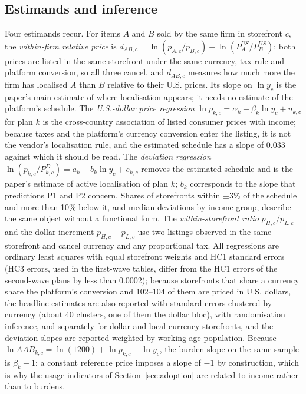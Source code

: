 \documentclass[11pt]{article}
\theoremstyle{definition}
\theoremstyle{remark}
\newcommand{\AAB}{\mathit{AAB}}
\begin{document}
\subsection{Estimands and inference}

Four estimands recur. For items $A$ and $B$ sold by the same firm in storefront $c$, the \emph{within-firm relative price} is $d_{AB,c}=\ln(p_{A,c}/p_{B,c})-\ln(P^{US}_A/P^{US}_B)$: both prices are listed in the same storefront under the same currency, tax rule and platform conversion, so all three cancel, and $d_{AB,c}$ measures how much more the firm has localised $A$ than $B$ relative to their U.S. prices. Its slope on $\ln y_c$ is the paper's main estimate of where localisation appears; it needs no estimate of the platform's schedule. The \emph{U.S.-dollar price regression} $\ln p_{k,c}=\alpha_k+\beta_k\ln y_c+u_{k,c}$ for plan $k$ is the cross-country association of listed consumer prices with income; because taxes and the platform's currency conversion enter the listing, it is not the vendor's localisation rule, and the estimated schedule has a slope of 0.033 against which it should be read. The \emph{deviation regression} $\ln(p_{k,c}/P^D_{k,c})=a_k+b_k\ln y_c+e_{k,c}$ removes the estimated schedule and is the paper's estimate of active localisation of plan $k$; $b_k$ corresponds to the slope that predictions P1 and P2 concern. Shares of storefronts within $\pm3\%$ of the schedule and more than 10\% below it, and median deviations by income group, describe the same object without a functional form. The \emph{within-storefront ratio} $p_{H,c}/p_{L,c}$ and the dollar increment $p_{H,c}-p_{L,c}$ use two listings observed in the same storefront and cancel currency and any proportional tax. All regressions are ordinary least squares with equal storefront weights and HC1 standard errors (HC3 errors, used in the first-wave tables, differ from the HC1 errors of the second-wave plans by less than 0.0002); because storefronts that share a currency share the platform's conversion and 102--104 of them are priced in U.S. dollars, the headline estimates are also reported with standard errors clustered by currency (about 40 clusters, one of them the dollar bloc), with randomisation inference, and separately for dollar and local-currency storefronts, and the deviation slopes are reported weighted by working-age population. Because $\ln\AAB_{k,c}=\ln(1200)+\ln p_{k,c}-\ln y_c$, the burden slope on the same sample is $\beta_k-1$; a constant reference price imposes a slope of $-1$ by construction, which is why the usage indicators of Section~\ref{sec:adoption} are related to income rather than to burdens.
\end{document}
